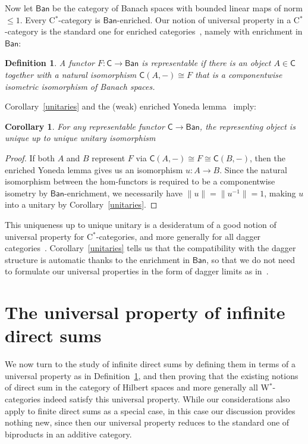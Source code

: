 \documentclass[reqno,T1,11pt]{amsproc}
\newcommand{\cat}[1]{\mathsf{#1}}		%
\newcommand{\Ban}{\mathsf{Ban}}			%
\theoremstyle{plain}
\newtheorem{cor}[thm]{Corollary}
\newtheorem{defn}[thm]{Definition}
\theoremstyle{remark}
\numberwithin{equation}{section}
\begin{document}
Now let $\Ban$ be the category of Banach spaces with bounded linear maps of norm $\leq 1$. Every C$^*$-category is $\Ban$-enriched. Our notion of universal property in a C$^*$-category is the standard one for enriched categories~\cite[Section~1.10]{kelly}, namely with enrichment in $\Ban$:

\begin{defn}
\label{def_univ}
A functor $F : \cat{C} \to \Ban$ is \emph{representable} if there is an object $A \in \cat{C}$ together with a natural isomorphism $\cat{C}(A,-)\cong F$ that is a componentwise isometric isomorphism of Banach spaces.
\end{defn}

Corollary~\ref{unitaries} and the (weak) enriched Yoneda lemma~\cite[Section~1.9]{kelly} imply:

\begin{cor}
\label{unique_up_to_unitary}
For any representable functor $\cat{C} \to \Ban$, the representing object is unique up to unique \emph{unitary} isomorphism
\end{cor}

\begin{proof}
	If both $A$ and $B$ represent $F$ via $\cat{C}(A,-)\cong F\cong \cat{C}(B,-)$, then the enriched Yoneda lemma gives us an isomorphism $u : A \to B$. Since the natural isomorphism between the hom-functors is required to be a componentwise isometry by $\Ban$-enrichment, we necessarily have $\| u \| = \| u^{-1} \| = 1$, making $u$ into a unitary by Corollary~\ref{unitaries}.
\end{proof}

This uniqueness up to unique unitary is a desideratum of a good notion of universal property for C$^*$-categories, and more generally for all dagger categories~\cite{daglims}. Corollary~\ref{unitaries} tells us that the compatibility with the dagger structure is automatic thanks to the enrichment in $\Ban$, so that we do not need to formulate our universal properties in the form of dagger limits as in~\cite{daglims}.


\section{The universal property of infinite direct sums}
\label{sec_directsum_def}

We now turn to the study of infinite direct sums by defining them in terms of a universal property as in Definition~\ref{def_univ}, and then proving that the existing notions of direct sum in the category of Hilbert spaces and more generally all W$^*$-categories indeed satisfy this universal property. While our considerations also apply to finite direct sums as a special case, in this case our discussion provides nothing new, since then our universal property reduces to the standard one of biproducts in an additive category.
\end{document}
